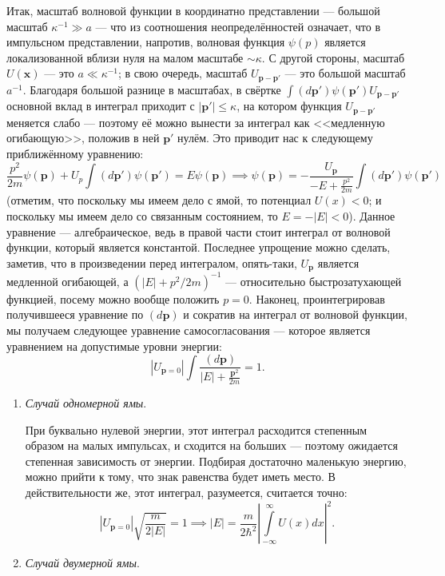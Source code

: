 \documentclass[a4paper]{article}
\begin{document}
\begin{sol}
Итак, масштаб волновой функции в координатно представлении
--- большой масштаб $\kappa^{-1}\gg a$ --- что из соотношения
неопределённостей означает, что в импульсном представлении,
напротив, волновая функция $\psi(p)$ является локализованной
вблизи нуля на малом масштабе $\sim \kappa$. С другой стороны,
масштаб $U(\mathbf{x})$ --- это $a \ll \kappa^{-1}$; в свою
очередь, масштаб $U_{\mathbf{p}-\mathbf{p}'}$ --- это большой
масштаб $a^{-1}$. Благодаря большой разнице в масштабах,
в свёртке $\int (d\mathbf{p}') \psi(\mathbf{p}')U_{\mathbf{p}-
\mathbf{p}'}$ основной вклад в интеграл приходит с $|\mathbf{p}'|
\le \kappa$, на котором функция $U_{\mathbf{p}-\mathbf{p}'}$ 
меняется слабо --- поэтому её можно вынести за интеграл
как <<медленную огибающую>>, положив в ней $\mathbf{p}'$ 
нулём. Это приводит нас к следующему приближённому уравнению:
\[
	\frac{p^2}{2m}\psi(\mathbf{p})+U_p \int
	(d\mathbf{p}')\psi(\mathbf{p}')=
	E \psi(\mathbf{p})\implies
	\psi(\mathbf{p})= -\frac{U_{\mathbf{p}}}{-E +\frac{p^2}{
	2m}}\int (d \mathbf{p}')\psi(\mathbf{p}')
\] 
(отметим, что поскольку мы имеем дело с ямой, то потенциал
$U(x)<0$; и поскольку мы имеем дело со связанным состоянием,
то $E= -|E|<0$). Данное уравнение --- алгебраическое, ведь
в правой части стоит интеграл от волновой функции,
который является константой. Последнее упрощение можно сделать,
заметив, что в произведении перед интегралом, опять-таки,
$U_\mathbf{p}$ является медленной огибающей, а  $(|E|+p^2 /2m)^{-1}$ --- относительно быстрозатухающей функцией, посему можно
вообще положить $p=0$. Наконец, проинтегрировав получившееся
уравнение по $(d\mathbf{p})$ и сократив на интеграл от волновой
функции, мы получаем следующее уравнение самосогласования
--- которое является уравнением на допустимые уровни
энергии:
\[
	|U_{\mathbf{p}=0}|\int \frac{(d\mathbf{p})}{|E|+
	\frac{\mathbf{p}^2}{2m}}=1
.\]
\begin{enumerate}
\item \emph{Случай одномерной ямы}.

При буквально нулевой энергии, этот интеграл расходится степенным
образом на малых импульсах, и сходится на больших ---
поэтому ожидается степенная зависимость от энергии. Подбирая
достаточно маленькую энергию, можно прийти к тому, что
знак равенства будет иметь место. В действительности же,
этот интеграл, разумеется, считается точно:
\[
	|U_{\mathbf{p}=0}|\sqrt{\frac{m}{2|E|}} =1\implies
	|E|= \frac{m}{2\hbar^2}\left| \int\limits_{-\infty}^{\infty} U(x)dx  \right| ^2
.\] 
\item \emph{Случай двумерной ямы}.


\end{enumerate}
\end{sol}
\end{document}
